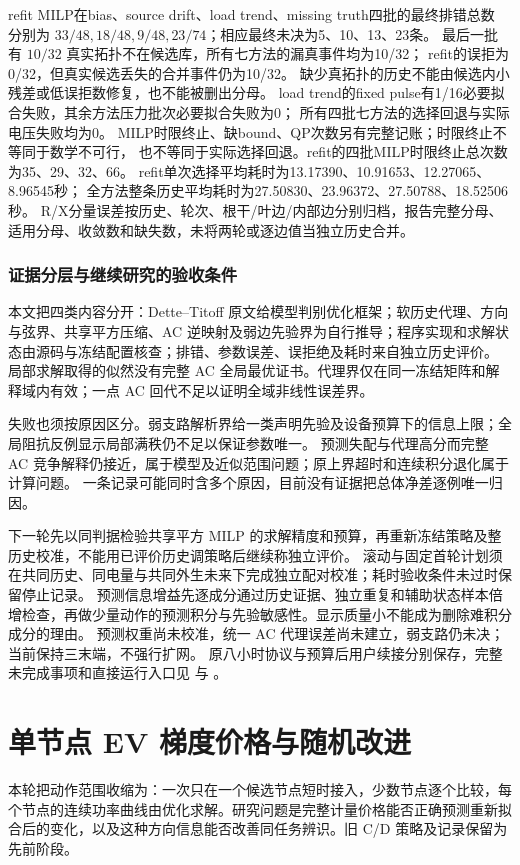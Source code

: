 \documentclass[UTF8,fontset=fandol,11pt,a4paper]{ctexart}
\begin{document}
refit MILP在bias、source drift、load trend、missing truth四批的最终排错总数
分别为 $33/48,18/48,9/48,23/74$；相应最终未决为5、10、13、23条。
最后一批有 $10/32$ 真实拓扑不在候选库，所有七方法的漏真事件均为10/32；
refit的误拒为0/32，但真实候选丢失的合并事件仍为10/32。
缺少真拓扑的历史不能由候选内小残差或低误拒数修复，也不能被删出分母。
load trend的fixed pulse有1/16必要拟合失败，其余方法压力批次必要拟合失败为0；
所有四批七方法的选择回退与实际电压失败均为0。
MILP时限终止、缺bound、QP次数另有完整记账；时限终止不等同于数学不可行，
也不等同于实际选择回退。refit的四批MILP时限终止总次数为35、29、32、66。
refit单次选择平均耗时为13.17390、10.91653、12.27065、8.96545秒；
全方法整条历史平均耗时为27.50830、23.96372、27.50788、18.52506秒。
R/X分量误差按历史、轮次、根干/叶边/内部边分别归档，报告完整分母、
适用分母、收敛数和缺失数，未将两轮或逐边值当独立历史合并。
\subsubsection{证据分层与继续研究的验收条件}
本文把四类内容分开：Dette--Titoff 原文给模型判别优化框架；软历史代理、方向与弦界、共享平方压缩、AC 逆映射及弱边先验界为自行推导；程序实现和求解状态由源码与冻结配置核查；排错、参数误差、误拒绝及耗时来自独立历史评价。
局部求解取得的似然没有完整 AC 全局最优证书。代理界仅在同一冻结矩阵和解释域内有效；一点 AC 回代不足以证明全域非线性误差界。

失败也须按原因区分。弱支路解析界给一类声明先验及设备预算下的信息上限；全局阻抗反例显示局部满秩仍不足以保证参数唯一。
预测失配与代理高分而完整 AC 竞争解释仍接近，属于模型及近似范围问题；原上界超时和连续积分退化属于计算问题。
一条记录可能同时含多个原因，目前没有证据把总体净差逐例唯一归因。

下一轮先以同判据检验共享平方 MILP 的求解精度和预算，再重新冻结策略及整历史校准，不能用已评价历史调策略后继续称独立评价。
滚动与固定首轮计划须在共同历史、同电量与共同外生未来下完成独立配对校准；耗时验收条件未过时保留停止记录。
预测信息增益先逐成分通过历史证据、独立重复和辅助状态样本倍增检查，再做少量动作的预测积分与先验敏感性。显示质量小不能成为删除难积分成分的理由。
预测权重尚未校准，统一 AC 代理误差尚未建立，弱支路仍未决；当前保持三末端，不强行扩网。
原八小时协议与预算后用户续接分别保存，完整未完成事项和直接运行入口见  与 。

\section{单节点 EV 梯度价格与随机改进}
\label{sec:gp}
本轮把动作范围收缩为：一次只在一个候选节点短时接入，少数节点逐个比较，每个节点的连续功率曲线由优化求解。研究问题是完整计量价格能否正确预测重新拟合后的变化，以及这种方向信息能否改善同任务辨识。旧 C/D 策略及记录保留为先前阶段。
\end{document}
